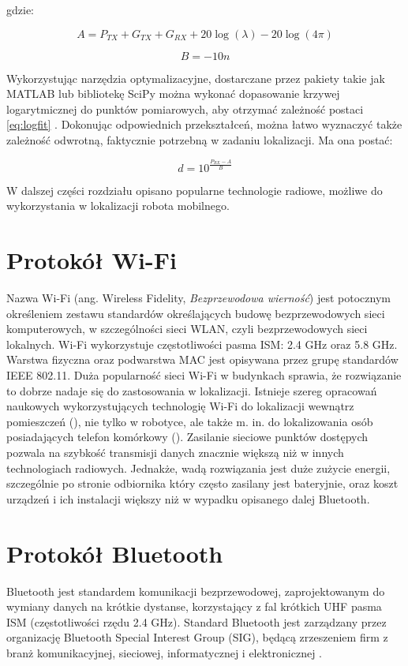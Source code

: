 gdzie:

\begin{equation}
\label{eq:logfitA}
A = P_{TX}+G_{TX}+G_{RX} + 20\log(\lambda) - 20\log(4\pi)
\end{equation}

\begin{equation}
\label{eq:logfitB}
B = -10n
\end{equation}

Wykorzystując narzędzia optymalizacyjne, dostarczane przez pakiety takie jak MATLAB lub bibliotekę SciPy można wykonać dopasowanie krzywej logarytmicznej do punktów pomiarowych, aby otrzymać zależność postaci \ref{eq:logfit} \cite{scipy}. Dokonując odpowiednich przekształceń, można łatwo wyznaczyć także zależność odwrotną, faktycznie potrzebną w zadaniu lokalizacji. Ma ona postać:

\begin{equation}
\label{eq:logfit_d}
d = 10 ^ {\frac{P_{RX}-A}{B}}
\end{equation}

W dalszej części rozdziału opisano popularne technologie radiowe, możliwe do wykorzystania w lokalizacji robota mobilnego. 

\section{Protokół Wi-Fi}
\label{sec:wifi}
Nazwa Wi-Fi (ang. Wireless Fidelity, \textit{Bezprzewodowa wierność}) jest potocznym określeniem zestawu standardów określających budowę bezprzewodowych sieci komputerowych, w szczególności sieci WLAN, czyli bezprzewodowych sieci lokalnych. Wi-Fi wykorzystuje częstotliwości pasma ISM: 2.4 GHz oraz 5.8 GHz. Warstwa fizyczna oraz podwarstwa MAC jest opisywana przez grupę standardów IEEE 802.11. Duża popularność sieci Wi-Fi w budynkach sprawia, że rozwiązanie to dobrze nadaje się do zastosowania w lokalizacji. Istnieje szereg opracowań naukowych wykorzystujących technologię Wi-Fi do lokalizacji wewnątrz pomieszczeń (\cite{fingerprinting}), nie tylko w robotyce, ale także m. in. do lokalizowania osób posiadających telefon komórkowy (\cite{rssi}). Zasilanie sieciowe punktów dostępych pozwala na szybkość transmisji danych znacznie większą niż w innych technologiach radiowych. Jednakże, wadą rozwiązania jest duże zużycie energii, szczególnie po stronie odbiornika który często zasilany jest bateryjnie, oraz koszt urządzeń i ich instalacji większy niż w wypadku opisanego dalej Bluetooth. 


\section{Protokół Bluetooth}
\label{sec:bluetooth}
Bluetooth jest standardem komunikacji bezprzewodowej, zaprojektowanym do wymiany danych na krótkie dystanse, korzystający z fal krótkich UHF pasma ISM (częstotliwości rzędu 2.4 GHz). Standard Bluetooth jest zarządzany przez organizację Bluetooth Special Interest Group (SIG), będącą zrzeszeniem firm z branż komunikacyjnej, sieciowej, informatycznej i elektronicznej \cite{ble}. 

